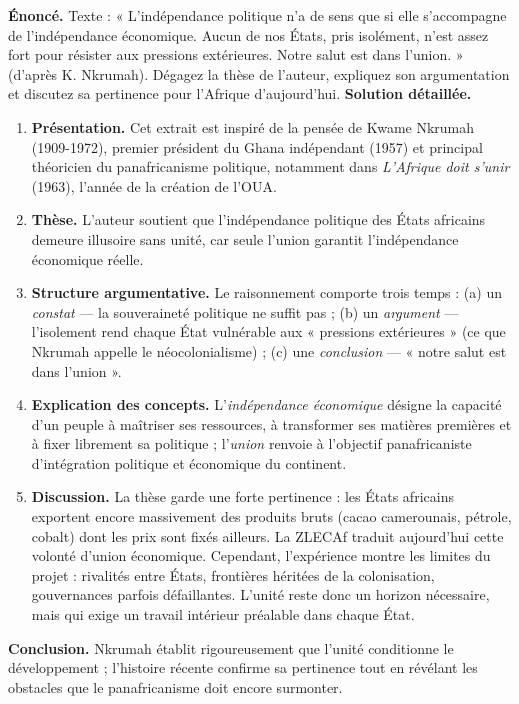\documentclass[11pt]{article}
\begin{document}
\begin{exoresolu}
\textbf{Énoncé.} Texte : « L'indépendance politique n'a de sens que si elle s'accompagne de l'indépendance économique. Aucun de nos États, pris isolément, n'est assez fort pour résister aux pressions extérieures. Notre salut est dans l'union. » (d'après K. Nkrumah). Dégagez la thèse de l'auteur, expliquez son argumentation et discutez sa pertinence pour l'Afrique d'aujourd'hui.
\tcblower
\textbf{Solution détaillée.}
\begin{enumerate}
\item \textbf{Présentation.} Cet extrait est inspiré de la pensée de Kwame Nkrumah (1909-1972), premier président du Ghana indépendant (1957) et principal théoricien du panafricanisme politique, notamment dans \emph{L'Afrique doit s'unir} (1963), l'année de la création de l'OUA.
\item \textbf{Thèse.} L'auteur soutient que l'indépendance politique des États africains demeure illusoire sans unité, car seule l'union garantit l'indépendance économique réelle.
\item \textbf{Structure argumentative.} Le raisonnement comporte trois temps : (a) un \emph{constat} — la souveraineté politique ne suffit pas ; (b) un \emph{argument} — l'isolement rend chaque État vulnérable aux « pressions extérieures » (ce que Nkrumah appelle le néocolonialisme) ; (c) une \emph{conclusion} — « notre salut est dans l'union ».
\item \textbf{Explication des concepts.} L'\emph{indépendance économique} désigne la capacité d'un peuple à maîtriser ses ressources, à transformer ses matières premières et à fixer librement sa politique ; l'\emph{union} renvoie à l'objectif panafricaniste d'intégration politique et économique du continent.
\item \textbf{Discussion.} La thèse garde une forte pertinence : les États africains exportent encore massivement des produits bruts (cacao camerounais, pétrole, cobalt) dont les prix sont fixés ailleurs. La ZLECAf traduit aujourd'hui cette volonté d'union économique. Cependant, l'expérience montre les limites du projet : rivalités entre États, frontières héritées de la colonisation, gouvernances parfois défaillantes. L'unité reste donc un horizon nécessaire, mais qui exige un travail intérieur préalable dans chaque État.
\end{enumerate}
\textbf{Conclusion.} Nkrumah établit rigoureusement que l'unité conditionne le développement ; l'histoire récente confirme sa pertinence tout en révélant les obstacles que le panafricanisme doit encore surmonter.
\end{exoresolu}
\end{document}
